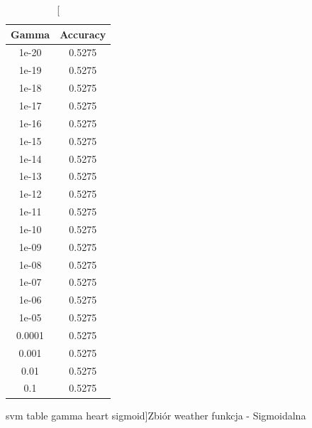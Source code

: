 \documentclass{classrep}
\begin{document}
{{\begin{table}[!htbp]
                \hfill
                \begin{minipage}{.3\textwidth}
                    \centering
                    \begin{tabular}{|c|c|}
                        \hline
                        Gamma & Accuracy \\ \hline
                        1e-20 & 0.5275 \\ \hline
                        1e-19 & 0.5275 \\ \hline
                        1e-18 & 0.5275 \\ \hline
                        1e-17 & 0.5275 \\ \hline
                        1e-16 & 0.5275 \\ \hline
                        1e-15 & 0.5275 \\ \hline
                        1e-14 & 0.5275 \\ \hline
                        1e-13 & 0.5275 \\ \hline
                        1e-12 & 0.5275 \\ \hline
                        1e-11 & 0.5275 \\ \hline
                        1e-10 & 0.5275 \\ \hline
                        1e-09 & 0.5275 \\ \hline
                        1e-08 & 0.5275 \\ \hline
                        1e-07 & 0.5275 \\ \hline
                        1e-06 & 0.5275 \\ \hline
                        1e-05 & 0.5275 \\ \hline
                        0.0001 & 0.5275 \\ \hline
                        0.001 & 0.5275 \\ \hline
                        0.01 & 0.5275 \\ \hline
                        0.1 & 0.5275 \\ \hline
                    \end{tabular}
                    \caption
                    [svm table gamma heart sigmoid]{Zbiór weather funkcja - Sigmoidalna}
                    \label{svn_table_gamma_heart_sigmoid}
                \end{minipage}
            \end{table}
            \FloatBarrier
            \begin{figure}[!htbp]

\end{figure}}}
\end{document}

